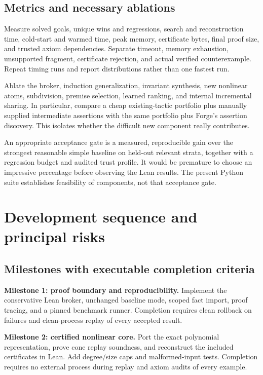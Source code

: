 \documentclass[11pt,a4paper]{article}
\begin{document}
\subsection{Metrics and necessary ablations}
Measure solved goals, unique wins and regressions, search and reconstruction time, cold-start and warmed time, peak memory, certificate bytes, final proof size, and trusted axiom dependencies. Separate timeout, memory exhaustion, unsupported fragment, certificate rejection, and actual verified counterexample. Repeat timing runs and report distributions rather than one fastest run.

Ablate the broker, induction generalization, invariant synthesis, new nonlinear atoms, subdivision, premise selection, learned ranking, and internal incremental sharing. In particular, compare a cheap existing-tactic portfolio plus manually supplied intermediate assertions with the same portfolio plus Forge's assertion discovery. This isolates whether the difficult new component really contributes.

An appropriate acceptance gate is a measured, reproducible gain over the strongest reasonable simple baseline on held-out relevant strata, together with a regression budget and audited trust profile. It would be premature to choose an impressive percentage before observing the Lean results. The present Python suite establishes feasibility of components, not that acceptance gate.

\section{Development sequence and principal risks}
\subsection{Milestones with executable completion criteria}
\textbf{Milestone 1: proof boundary and reproducibility.} Implement the conservative Lean broker, unchanged baseline mode, scoped fact import, proof tracing, and a pinned benchmark runner. Completion requires clean rollback on failures and clean-process replay of every accepted result.

\textbf{Milestone 2: certified nonlinear core.} Port the exact polynomial representation, prove cone replay soundness, and reconstruct the included certificates in Lean. Add degree/size caps and malformed-input tests. Completion requires no external process during replay and axiom audits of every example.
\end{document}
